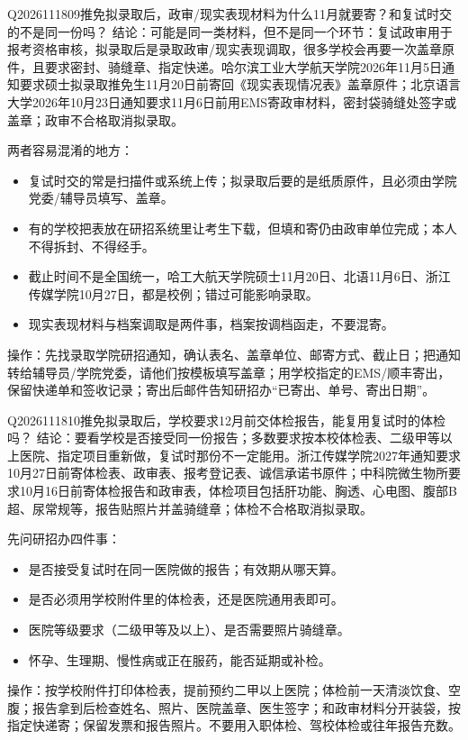 \begin{qa}{Q2026111809}{推免拟录取后，政审/现实表现材料为什么11月就要寄？和复试时交的不是同一份吗？}
结论：可能是同一类材料，但不是同一个环节：复试政审用于报考资格审核，拟录取后是录取政审/现实表现调取，很多学校会再要一次盖章原件，且要求密封、骑缝章、指定快递。哈尔滨工业大学航天学院2026年11月5日通知要求硕士拟录取推免生11月20日前寄回《现实表现情况表》盖章原件；北京语言大学2026年10月23日通知要求11月6日前用EMS寄政审材料，密封袋骑缝处签字或盖章；政审不合格取消拟录取。

两者容易混淆的地方：

\begin{itemize}
\item 复试时交的常是扫描件或系统上传；拟录取后要的是纸质原件，且必须由学院党委/辅导员填写、盖章。
\item 有的学校把表放在研招系统里让考生下载，但填和寄仍由政审单位完成；本人不得拆封、不得经手。
\item 截止时间不是全国统一，哈工大航天学院硕士11月20日、北语11月6日、浙江传媒学院10月27日，都是校例；错过可能影响录取。
\item 现实表现材料与档案调取是两件事，档案按调档函走，不要混寄。
\end{itemize}

操作：先找录取学院研招通知，确认表名、盖章单位、邮寄方式、截止日；把通知转给辅导员/学院党委，请他们按模板填写盖章；用学校指定的EMS/顺丰寄出，保留快递单和签收记录；寄出后邮件告知研招办“已寄出、单号、寄出日期”。
\end{qa}

\begin{qa}{Q2026111810}{推免拟录取后，学校要求12月前交体检报告，能复用复试时的体检吗？}
结论：要看学校是否接受同一份报告；多数要求按本校体检表、二级甲等以上医院、指定项目重新做，复试时那份不一定能用。浙江传媒学院2027年通知要求10月27日前寄体检表、政审表、报考登记表、诚信承诺书原件；中科院微生物所要求10月16日前寄体检报告和政审表，体检项目包括肝功能、胸透、心电图、腹部B超、尿常规等，报告贴照片并盖骑缝章；体检不合格取消拟录取。

先问研招办四件事：

\begin{itemize}
\item 是否接受复试时在同一医院做的报告；有效期从哪天算。
\item 是否必须用学校附件里的体检表，还是医院通用表即可。
\item 医院等级要求（二级甲等及以上）、是否需要照片骑缝章。
\item 怀孕、生理期、慢性病或正在服药，能否延期或补检。
\end{itemize}

操作：按学校附件打印体检表，提前预约二甲以上医院；体检前一天清淡饮食、空腹；报告拿到后检查姓名、照片、医院盖章、医生签字；和政审材料分开装袋，按指定快递寄；保留发票和报告照片。不要用入职体检、驾校体检或往年报告充数。
\end{qa}
